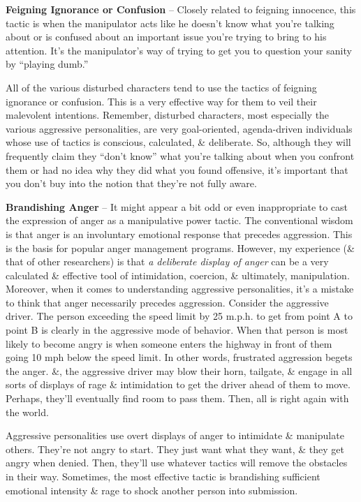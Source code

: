 \documentclass{article}
\numberwithin{equation}{section}
\begin{document}
\textbf{Feigning Ignorance or Confusion} -- Closely related to feigning innocence, this tactic is when the manipulator acts like he doesn't know what you're talking about or is confused about an important issue you're trying to bring to his attention. It's the manipulator's way of trying to get you to question your sanity by ``playing dumb.''

All of the various disturbed characters tend to use the tactics of feigning ignorance or confusion. This is a very effective way for them to veil their malevolent intentions. Remember, disturbed characters, most especially the various aggressive personalities, are very goal-oriented, agenda-driven individuals whose use of tactics is conscious, calculated, \& deliberate. So, although they will frequently claim they ``don't know'' what you're talking about when you confront them or had no idea why they did what you found offensive, it's important that you don't buy into the notion that they're not fully aware.

\textbf{Brandishing Anger} -- It might appear a bit odd or even inappropriate to cast the expression of anger as a manipulative power tactic. The conventional wisdom is that anger is an involuntary emotional response that precedes aggression. This is the basis for popular anger management programs. However, my experience (\& that of other researchers) is that \textit{a deliberate display of anger} can be a very calculated \& effective tool of intimidation, coercion, \& ultimately, manipulation. Moreover, when it comes to understanding aggressive personalities, it's a mistake to think that anger necessarily precedes aggression. Consider the aggressive driver. The person exceeding the speed limit by 25 m.p.h. to get from point A to point B is clearly in the aggressive mode of behavior. When that person is most likely to become angry is when someone enters the highway in front of them going 10 mph below the speed limit. In other words, frustrated aggression begets the anger. \&, the aggressive driver may blow their horn, tailgate, \& engage in all sorts of displays of rage \& intimidation to get the driver ahead of them to move. Perhaps, they'll eventually find room to pass them. Then, all is right again with the world.

Aggressive personalities use overt displays of anger to intimidate \& manipulate others. They're not angry to start. They just want what they want, \& they get angry when denied. Then, they'll use whatever tactics will remove the obstacles in their way. Sometimes, the most effective tactic is brandishing sufficient emotional intensity \& rage to shock another person into submission.
\end{document}
